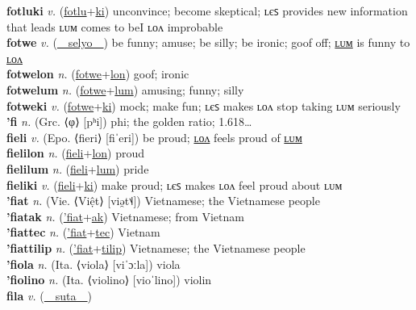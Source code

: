 \textbf{fotluki} \textit{v.} (\hyperref[fotlu]{fotlu}+\hyperref[ki]{ki})
unconvince; become skeptical; ʟєꜱ provides new information that leads ʟᴜᴍ comes to beI ʟᴏᴧ improbable \label{fotluki} \\
\textbf{fotwe} \textit{v.} (\hyperref[selyo]{~~selyo~~})
be funny; amuse; be silly; be ironic; goof off; \hyperref[fotwelum]{ʟᴜᴍ} is funny to \hyperref[fotwelon]{ʟᴏᴧ} \label{fotwe} \\
\textbf{fotwelon} \textit{n.} (\hyperref[fotwe]{fotwe}+\hyperref[lon]{lon})
goof; ironic \label{fotwelon} \\
\textbf{fotwelum} \textit{n.} (\hyperref[fotwe]{fotwe}+\hyperref[lum]{lum})
amusing; funny; silly \label{fotwelum} \\
\textbf{fotweki} \textit{v.} (\hyperref[fotwe]{fotwe}+\hyperref[ki]{ki})
mock; make fun; ʟєꜱ makes ʟᴏᴧ stop taking ʟᴜᴍ seriously \label{fotweki} \\
\textbf{'fi} \textit{n.} (Grc. ⟨φ⟩ [pʰi])
phi; the golden ratio; 1.618… \label{'fi} \\
\textbf{fieli} \textit{v.} (Epo. ⟨fieri⟩ [fiˈeri])
be proud; \hyperref[fielilon]{ʟᴏᴧ} feels proud of \hyperref[fielilum]{ʟᴜᴍ} \label{fieli} \\
\textbf{fielilon} \textit{n.} (\hyperref[fieli]{fieli}+\hyperref[lon]{lon})
proud \label{fielilon} \\
\textbf{fielilum} \textit{n.} (\hyperref[fieli]{fieli}+\hyperref[lum]{lum})
pride \label{fielilum} \\
\textbf{fieliki} \textit{v.} (\hyperref[fieli]{fieli}+\hyperref[ki]{ki})
make proud; ʟєꜱ makes ʟᴏᴧ feel proud about ʟᴜᴍ \label{fieliki} \\
\textbf{'fiat} \textit{n.} (Vie. ⟨Việt⟩ [viə̯t˦˨])
Vietnamese; the Vietnamese people \label{'fiat} \\
\textbf{'fiatak} \textit{n.} (\hyperref['fiat]{'fiat}+\hyperref[ak]{ak})
Vietnamese; from Vietnam \label{'fiatak} \\
\textbf{'fiattec} \textit{n.} (\hyperref['fiat]{'fiat}+\hyperref[tec]{tec})
Vietnam \label{'fiattec} \\
\textbf{'fiattilip} \textit{n.} (\hyperref['fiat]{'fiat}+\hyperref[tilip]{tilip})
Vietnamese; the Vietnamese people \label{'fiattilip} \\
\textbf{'fiola} \textit{n.} (Ita. ⟨viola⟩ [viˈɔːla])
viola \label{'fiola} \\
\textbf{'fiolino} \textit{n.} (Ita. ⟨violino⟩ [vioˈlino])
violin \label{'fiolino} \\
\textbf{fila} \textit{v.} (\hyperref[suta]{~~suta~~})
